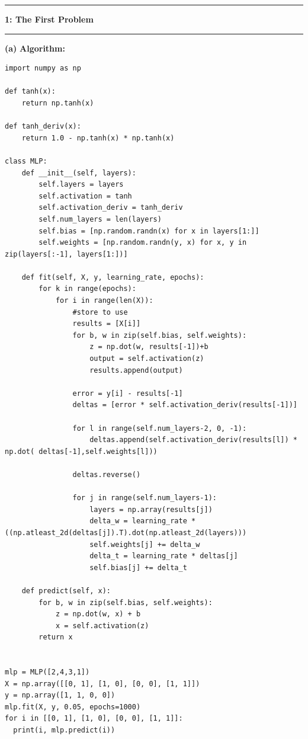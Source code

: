 \documentclass[11pt]{article}
\newcommand\question[2]{\vspace{.25in}\hrule\textbf{#1: #2}\vspace{.5em}\hrule\vspace{.10in}}
\renewcommand\part[1]{\vspace{.10in}\textbf{(#1)}}
\newcommand\algorithm{\vspace{.10in}\textbf{Algorithm: }}
\begin{document}
\raggedright
\newcommand\NAME{Yao Xiao}  %
\newcommand\ANDREWID{2019180015}     %
\newcommand\HWNUM{3}              %


\question{1}{The First Problem} 

\part{a} \algorithm
\begin{lstlisting}
import numpy as np
 
def tanh(x):
    return np.tanh(x)
 
def tanh_deriv(x):
    return 1.0 - np.tanh(x) * np.tanh(x)

class MLP:
    def __init__(self, layers):
        self.layers = layers
        self.activation = tanh
        self.activation_deriv = tanh_deriv
        self.num_layers = len(layers)
        self.bias = [np.random.randn(x) for x in layers[1:]]
        self.weights = [np.random.randn(y, x) for x, y in zip(layers[:-1], layers[1:])]
 
    def fit(self, X, y, learning_rate, epochs):
        for k in range(epochs):
            for i in range(len(X)):
                #store to use
                results = [X[i]]
                for b, w in zip(self.bias, self.weights):
                    z = np.dot(w, results[-1])+b
                    output = self.activation(z)
                    results.append(output)

                error = y[i] - results[-1]
                deltas = [error * self.activation_deriv(results[-1])]
 
                for l in range(self.num_layers-2, 0, -1):
                    deltas.append(self.activation_deriv(results[l]) * np.dot( deltas[-1],self.weights[l]))

                deltas.reverse()
           
                for j in range(self.num_layers-1):
                    layers = np.array(results[j])
                    delta_w = learning_rate * ((np.atleast_2d(deltas[j]).T).dot(np.atleast_2d(layers)))
                    self.weights[j] += delta_w
                    delta_t = learning_rate * deltas[j]
                    self.bias[j] += delta_t
 
    def predict(self, x):
        for b, w in zip(self.bias, self.weights):
            z = np.dot(w, x) + b
            x = self.activation(z)
        return x


mlp = MLP([2,4,3,1])
X = np.array([[0, 1], [1, 0], [0, 0], [1, 1]])
y = np.array([1, 1, 0, 0])
mlp.fit(X, y, 0.05, epochs=1000)
for i in [[0, 1], [1, 0], [0, 0], [1, 1]]:
  print(i, mlp.predict(i))
\end{lstlisting}
\end{document}
